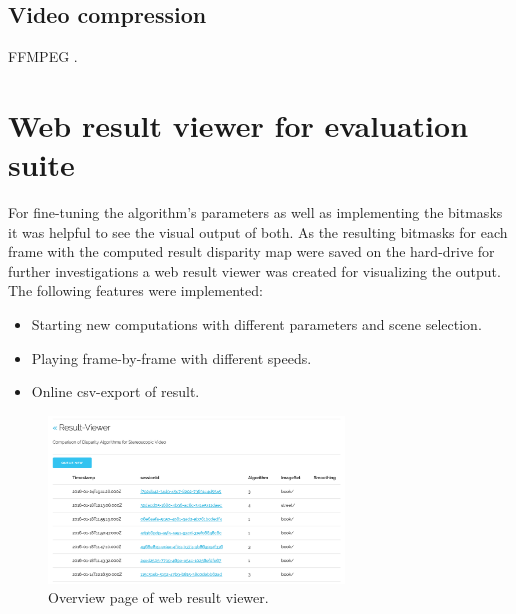 \begin{figure}[h!]
\center
{}
\end{figure}

\subsection*{Video compression}

FFMPEG \citep{FFMPEG2010}.

\section{Web result viewer for evaluation suite}

For fine-tuning the algorithm's parameters as well as implementing the bitmasks it was helpful to see the visual output of both.
As the resulting bitmasks for each frame with the computed result disparity map were saved on the hard-drive for further investigations a web result viewer was created for visualizing the output.
The following features were implemented:
\begin{itemize}
  \item Starting new computations with different parameters and scene selection.
  \item Playing frame-by-frame with different speeds.
  \item Online csv-export of result.
\end{itemize}

\begin{figure}[p!]
  \centering
  \includegraphics[angle=90,width=0.7\textwidth]{src/images/result-viewer-overview.png}
  \caption{Overview page of web result viewer.}
  \label{fig:web-overview}
\end{figure}

